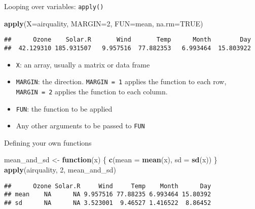 \documentclass[ignorenonframetext,]{beamer}
\newenvironment{Shaded}{\begin{snugshade}}{\end{snugshade}}
\newcommand{\ControlFlowTok}[1]{\textcolor[rgb]{0.13,0.29,0.53}{\textbf{#1}}}
\newcommand{\DataTypeTok}[1]{\textcolor[rgb]{0.13,0.29,0.53}{#1}}
\newcommand{\DecValTok}[1]{\textcolor[rgb]{0.00,0.00,0.81}{#1}}
\newcommand{\KeywordTok}[1]{\textcolor[rgb]{0.13,0.29,0.53}{\textbf{#1}}}
\newcommand{\NormalTok}[1]{#1}
\newcommand{\OtherTok}[1]{\textcolor[rgb]{0.56,0.35,0.01}{#1}}
\newcommand{\StringTok}[1]{\textcolor[rgb]{0.31,0.60,0.02}{#1}}
\providecommand{\tightlist}{%
  \setlength{\itemsep}{0pt}\setlength{\parskip}{0pt}}
\begin{document}
\begin{frame}[fragile]{Looping over variables: \texttt{apply()}}
\protect\hypertarget{looping-over-variables-apply}{}

\begin{Shaded}
\begin{Highlighting}[]
\KeywordTok{apply}\NormalTok{(}\DataTypeTok{X=}\NormalTok{airquality, }\DataTypeTok{MARGIN=}\DecValTok{2}\NormalTok{, }\DataTypeTok{FUN=}\NormalTok{mean, }\DataTypeTok{na.rm=}\OtherTok{TRUE}\NormalTok{)}
\end{Highlighting}
\end{Shaded}

\begin{verbatim}
##      Ozone    Solar.R       Wind       Temp      Month        Day 
##  42.129310 185.931507   9.957516  77.882353   6.993464  15.803922
\end{verbatim}

\begin{itemize}
\tightlist
\item
  \texttt{X}: an array, usually a matrix or data frame
\item
  \texttt{MARGIN}: the direction. \texttt{MARGIN\ =\ 1} applies the
  function to each row, \texttt{MARGIN\ =\ 2} applies the function to
  each column.
\item
  \texttt{FUN}: the function to be applied
\item
  Any other arguments to be passed to \texttt{FUN}
\end{itemize}

\end{frame}

\begin{frame}[fragile]{Defining your own functions}
\protect\hypertarget{defining-your-own-functions}{}

\begin{Shaded}
\begin{Highlighting}[]
\NormalTok{mean_and_sd <-}\StringTok{ }\ControlFlowTok{function}\NormalTok{(x) \{}
  \KeywordTok{c}\NormalTok{(}\DataTypeTok{mean =} \KeywordTok{mean}\NormalTok{(x), }\DataTypeTok{sd =} \KeywordTok{sd}\NormalTok{(x))}
\NormalTok{\}}
\KeywordTok{apply}\NormalTok{(airquality, }\DecValTok{2}\NormalTok{, mean_and_sd)}
\end{Highlighting}
\end{Shaded}

\begin{verbatim}
##      Ozone Solar.R     Wind     Temp    Month      Day
## mean    NA      NA 9.957516 77.88235 6.993464 15.80392
## sd      NA      NA 3.523001  9.46527 1.416522  8.86452
\end{verbatim}

\end{frame}
\end{document}
